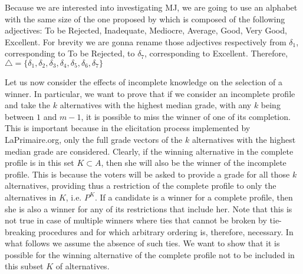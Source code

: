 %
%
%

\begin{remark}
	Because we are interested into investigating \acs{MJ}, we are going to use an alphabet with the same size of the one proposed by \citet{Balinski2011} which is composed of the following adjectives: To be Rejected, Inadequate, Mediocre, Average, Good, Very Good, Excellent. For brevity we are gonna rename those adjectives respectively from $\delta_1$, corresponding to To be Rejected, to $\delta_7$, corresponding to Excellent. Therefore, $\triangle=\{\delta_1,\delta_2, \delta_3,\delta_4,\delta_5,\delta_6,\delta_7\}$ 
\end{remark}

Let us now consider the effects of incomplete knowledge on the selection of a winner. In particular, we want to prove that if we consider an incomplete profile and take the $k$ alternatives with the highest median grade, with any $k$ being between $1$ and $m-1$, it is possible to miss the winner of one of its completion. 
This is important because in the elicitation process implemented by LaPrimaire.org, only the full grade vectors of the $k$ alternatives with the highest median grade are considered. Clearly, if the winning alternative in the complete profile is in this set $K \subset A$, then she will also be the winner of the incomplete profile. This is because the voters will be asked to provide a grade for all those $k$ alternatives, providing thus a restriction of the complete profile to only the alternatives in $K$, i.e. $P^K$. If a candidate is a winner for a complete profile, then she is also a winner for any of its restrictions that include her.
Note that this is not true in case of multiple winners where ties that cannot be broken by tie-breaking procedures and for which arbitrary ordering is, therefore, necessary. In what follows we assume the absence of such ties.
We want to show that it is possible for the winning alternative of the complete profile not to be included in this subset $K$ of alternatives.


